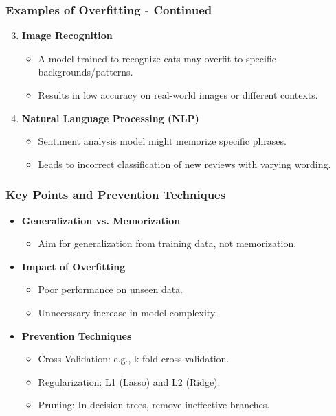 \documentclass[aspectratio=169]{beamer}
\begin{document}
\begin{frame}[fragile]
    \frametitle{Examples of Overfitting - Continued}
    \begin{enumerate}\setcounter{enumi}{2}
        \item \textbf{Image Recognition}
            \begin{itemize}
                \item A model trained to recognize cats may overfit to specific backgrounds/patterns.
                \item Results in low accuracy on real-world images or different contexts.
            \end{itemize}
        \item \textbf{Natural Language Processing (NLP)}
            \begin{itemize}
                \item Sentiment analysis model might memorize specific phrases.
                \item Leads to incorrect classification of new reviews with varying wording.
            \end{itemize}
    \end{enumerate}
\end{frame}

\begin{frame}[fragile]
    \frametitle{Key Points and Prevention Techniques}
    \begin{itemize}
        \item \textbf{Generalization vs. Memorization}
            \begin{itemize}
                \item Aim for generalization from training data, not memorization.
            \end{itemize}
        \item \textbf{Impact of Overfitting}
            \begin{itemize}
                \item Poor performance on unseen data.
                \item Unnecessary increase in model complexity.
            \end{itemize}
        \item \textbf{Prevention Techniques}
            \begin{itemize}
                \item Cross-Validation: e.g., k-fold cross-validation.
                \item Regularization: L1 (Lasso) and L2 (Ridge).
                \item Pruning: In decision trees, remove ineffective branches.
            \end{itemize}
    \end{itemize}
\end{frame}
\end{document}
